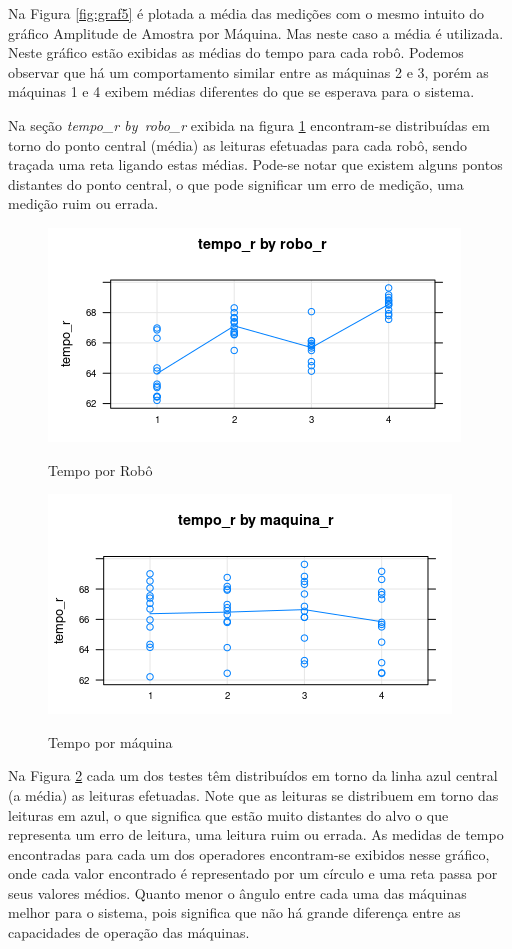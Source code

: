 \documentclass[
12pt,					%
openright,				%
oneside,				%
a4paper,				%
english,
brazil
]{ABNT/abntex2_report}
\begin{document}
Na Figura \ref{fig:graf5} é plotada a média das medições com o mesmo intuito do gráfico Amplitude de Amostra por Máquina. Mas neste caso a média é utilizada. Neste gráfico estão exibidas as médias do tempo para cada robô. Podemos observar que há um comportamento similar entre as máquinas 2 e 3, porém as máquinas 1 e 4 exibem médias diferentes do que se esperava para o
sistema.

Na seção \textit{tempo\_r by\ robo\_r} exibida na figura \ref{fig:tempo_robo} encontram-se distribuídas em torno do ponto central (média) as leituras efetuadas para cada robô, sendo traçada uma reta ligando estas médias. Pode-se notar que existem alguns pontos distantes do ponto central, o que pode significar um erro de medição, uma medição ruim ou errada.
\begin{figure}[H]
	\centering
	\caption{Tempo por Robô}
	\includegraphics[scale=0.9]{figures/graf2.png}
	\label{fig:tempo_robo}
\end{figure}

\begin{figure}[H]
	\centering
	\caption{Tempo por máquina}
	\includegraphics[scale = 0.9]{figures/graf4.png}
	\label{fig:graf4}
\end{figure}

Na Figura \ref{fig:graf4} cada um dos testes têm distribuídos em torno da linha azul central (a média) as leituras efetuadas. Note que as leituras se distribuem em torno das leituras em azul, o que significa que estão muito distantes do alvo o que representa um erro de leitura, uma leitura ruim ou errada. As medidas de tempo encontradas para cada um dos operadores encontram-se exibidos nesse gráfico, onde cada valor encontrado é representado por um círculo e uma reta passa por seus valores médios. Quanto menor o ângulo entre cada uma das máquinas melhor para o sistema, pois significa que não há grande diferença entre as capacidades de operação das máquinas.
\end{document}
